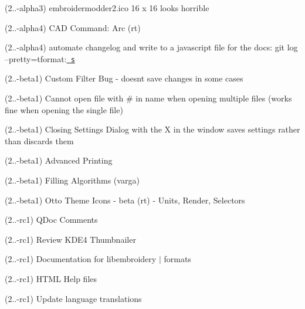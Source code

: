 \begin{DoxyRefList}
\label{todo__todo000033}%
%
(2..-\/alpha3) embroidermodder2.\+ico 16 x 16 looks horrible

\label{todo__todo000034}%
%
(2..-\/alpha4) CAD Command\+: Arc (rt)

\label{todo__todo000035}%
%
(2..-\/alpha4) automate changelog and write to a javascript file for the docs\+: git log --pretty=tformat\+:\textquotesingle{}\href{\\url{https://github.com/Embroidermodder/Embroidermodder/commit/\%H}}{\texttt{ s}}\textquotesingle{}

\label{todo__todo000036}%
%
(2..-\/beta1) Custom Filter Bug -\/ doesn\textquotesingle{}t save changes in some cases

\label{todo__todo000037}%
%
(2..-\/beta1) Cannot open file with {\ttfamily \#} in name when opening multiple files (works fine when opening the single file)

\label{todo__todo000038}%
%
(2..-\/beta1) Closing Settings Dialog with the X in the window saves settings rather than discards them

\label{todo__todo000039}%
%
(2..-\/beta1) Advanced Printing

\label{todo__todo000040}%
%
(2..-\/beta1) Filling Algorithms (varga)

\label{todo__todo000041}%
%
(2..-\/beta1) Otto Theme Icons -\/ beta (rt) -\/ Units, Render, Selectors

\label{todo__todo000042}%
%
(2..-\/rc1) QDoc Comments

\label{todo__todo000043}%
%
(2..-\/rc1) Review KDE4 Thumbnailer

\label{todo__todo000044}%
%
(2..-\/rc1) Documentation for libembroidery $|$ formats

\label{todo__todo000045}%
%
(2..-\/rc1) HTML Help files

\label{todo__todo000046}%
%
(2..-\/rc1) Update language translations


\end{DoxyRefList}
